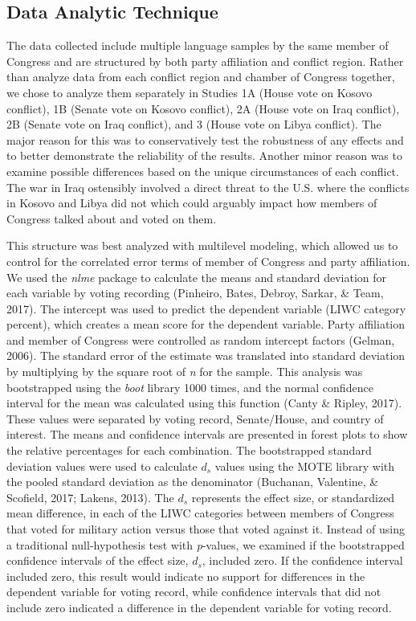 \documentclass[
  english,
  ,man,floatsintext]{apa6}
\begin{document}
\hypertarget{data-analytic-technique}{%
\subsection{Data Analytic Technique}\label{data-analytic-technique}}

The data collected include multiple language samples by the same member of Congress and are structured by both party affiliation and conflict region. Rather than analyze data from each conflict region and chamber of Congress together, we chose to analyze them separately in Studies 1A (House vote on Kosovo conflict), 1B (Senate vote on Kosovo conflict), 2A (House vote on Iraq conflict), 2B (Senate vote on Iraq conflict), and 3 (House vote on Libya conflict). The major reason for this was to conservatively test the robustness of any effects and to better demonstrate the reliability of the results. Another minor reason was to examine possible differences based on the unique circumstances of each conflict. The war in Iraq ostensibly involved a direct threat to the U.S. where the conflicts in Kosovo and Libya did not which could arguably impact how members of Congress talked about and voted on them.

This structure was best analyzed with multilevel modeling, which allowed us to control for the correlated error terms of member of Congress and party affiliation. We used the \emph{nlme} package to calculate the means and standard deviation for each variable by voting recording (Pinheiro, Bates, Debroy, Sarkar, \& Team, 2017). The intercept was used to predict the dependent variable (LIWC category percent), which creates a mean score for the dependent variable. Party affiliation and member of Congress were controlled as random intercept factors (Gelman, 2006). The standard error of the estimate was translated into standard deviation by multiplying by the square root of \emph{n} for the sample. This analysis was bootstrapped using the \emph{boot} library 1000 times, and the normal confidence interval for the mean was calculated using this function (Canty \& Ripley, 2017). These values were separated by voting record, Senate/House, and country of interest. The means and confidence intervals are presented in forest plots to show the relative percentages for each combination. The bootstrapped standard deviation values were used to calculate \(d_s\) values using the MOTE library with the pooled standard deviation as the denominator (Buchanan, Valentine, \& Scofield, 2017; Lakens, 2013). The \(d_s\) represents the effect size, or standardized mean difference, in each of the LIWC categories between members of Congress that voted for military action versus those that voted against it. Instead of using a traditional null-hypothesis test with \emph{p}-values, we examined if the bootstrapped confidence intervals of the effect size, \(d_s\), included zero. If the confidence interval included zero, this result would indicate no support for differences in the dependent variable for voting record, while confidence intervals that did not include zero indicated a difference in the dependent variable for voting record.
\end{document}
